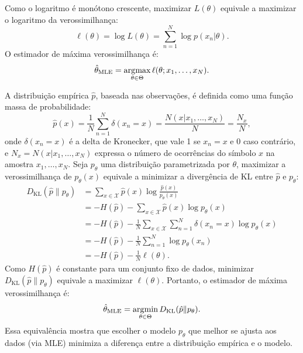 Como o logaritmo é monótono crescente, maximizar $L(\theta)$ equivale a maximizar o logaritmo da verossimilhança:
\begin{equation}
\ell(\theta) = \log L(\theta) = \sum_{n=1}^N \log p(x_n | \theta).
\end{equation}
O estimador de máxima verossimilhança é:
\begin{equation}
\hat{\theta}_{\text{MLE}} = \operatorname*{\arg\!\max}_{\theta \in \Theta} \ell(\theta; x_1, \ldots, x_N).
\end{equation}


A distribuição empírica \( \hat{p} \), baseada nas observações, é definida como uma função massa de probabilidade:
\begin{equation}
  \hat{p}(x) = \frac{1}{N} \sum_{n=1}^N \delta (x_n = x) = \frac{N(x \vert x_1, \ldots, x_N)}{N} = \frac{N_x}{N},
\end{equation}
onde $\delta(x_n = x)$ é a delta de Kronecker, que vale 1 se $x_n = x$ e 0 caso contrário, e
$N_x = N(x \vert x_1, \ldots, x_N)$ expressa o número de ocorrências do símbolo $x$ na amostra $x_1, \ldots, x_N$.
Seja $p_\theta$ uma distribuição parametrizada por $\theta$,
maximizar a verossimilhança de $p_\theta(x)$ equivale a minimizar a divergência de KL entre $\hat{p}$ e $p_\theta$:
\begin{subequations}
  \begin{align}
    D_{\text{KL}}(\hat{p} \| p_\theta) &= \sum_{x \in \mathcal{X}} \hat{p}(x) \log \frac{\hat{p}(x)}{p_\theta(x)} \\
                                       &= -H(\hat{p}) - \sum_{x \in \mathcal{X}} \hat{p}(x) \log p_\theta(x)  \nonumber \\
                                       &= -H(\hat{p}) - \frac{1}{N} \sum_{x \in \mathcal{X}} \sum_{n=1}^{N} \delta (x_n = x) \log p_\theta(x) \nonumber \\
                                       &= -H(\hat{p}) - \frac{1}{N} \sum_{n=1}^{N} \log p_\theta(x_n) \\
                                       &= -H(\hat{p}) - \frac{1}{N} \ell(\theta) .
  \end{align}
\end{subequations}
Como $H(\hat{p})$ é constante para um conjunto fixo de dados, minimizar 
$D_{\text{KL}}(\hat{p} \| p_\theta)$ equivale a maximizar $\ell(\theta)$. 
Portanto, o estimador de máxima verossimilhança é:
\begin{equation}
\hat{\theta}_{\text{MLE}} = \operatorname*{\arg\!\min}_{\theta \in \Theta} D_{\text{KL}}(\hat{p} \| p_\theta).
\end{equation}
Essa equivalência mostra que escolher o modelo $p_\theta$ que melhor se
ajusta aos dados (via MLE) minimiza a diferença entre a distribuição empírica e
o modelo.






